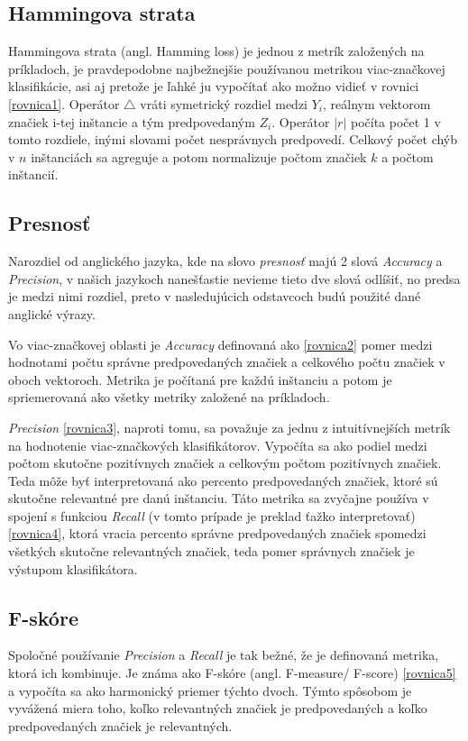 \subsection*{Hammingova strata} 
Hammingova strata (angl. Hamming loss) je jednou z metrík založených na príkladoch, je pravdepodobne najbežnejšie používanou metrikou viac-značkovej klasifikácie, asi aj pretože je ľahké ju vypočítať ako možno vidieť v rovnici \eqref{rovnica1}. Operátor \(\bigtriangleup\) vráti symetrický rozdiel medzi \(Y_{i}\), reálnym vektorom značiek i-tej inštancie a tým predpovedaným \(Z_{i}\). Operátor \(|r|\) počíta počet 1 v tomto rozdiele, inými slovami počet nesprávnych predpovedí. Celkový počet chýb v \(n\) inštanciách sa agreguje a potom normalizuje počtom značiek \(k\) a počtom inštancií.

\subsection*{Presnosť} 
Narozdiel od anglického jazyka, kde na slovo \textit{presnosť} majú 2 slová \textit{Accuracy} a \textit{Precision}, v našich jazykoch nanešťastie nevieme tieto dve slová odlíšiť, no predsa je medzi nimi rozdiel, preto v nasledujúcich odstavcoch budú použité dané anglické výrazy.  

Vo viac-značkovej oblasti je \textit{Accuracy} definovaná ako \eqref{rovnica2} pomer medzi hodnotami počtu správne predpovedaných značiek a celkového počtu značiek v oboch vektoroch. Metrika je počítaná pre každú inštanciu a potom je spriemerovaná ako všetky metriky založené na príkladoch.

\textit{Precision} \eqref{rovnica3}, naproti tomu, sa považuje za jednu z intuitívnejších metrík na hodnotenie viac-značkových klasifikátorov. Vypočíta sa ako podiel medzi počtom skutočne pozitívnych značiek a celkovým počtom pozitívnych značiek. Teda môže byť interpretovaná ako percento predpovedaných značiek, ktoré sú skutočne relevantné pre danú inštanciu. Táto metrika sa zvyčajne používa v spojení s funkciou \textit{Recall} (v tomto prípade je preklad ťažko interpretovať) \eqref{rovnica4}, ktorá vracia percento správne predpovedaných značiek spomedzi všetkých skutočne relevantných značiek, teda pomer správnych značiek je výstupom klasifikátora.

\subsection*{F-skóre}
Spoločné používanie \textit{Precision} a \textit{Recall} je tak bežné, že je definovaná metrika, ktorá ich kombinuje. Je známa ako F-skóre (angl. F-measure/ F-score) \eqref{rovnica5} a vypočíta sa ako harmonický priemer týchto dvoch. Týmto spôsobom je vyvážená miera toho, koľko relevantných značiek je predpovedaných a koľko predpovedaných značiek je relevantných.

